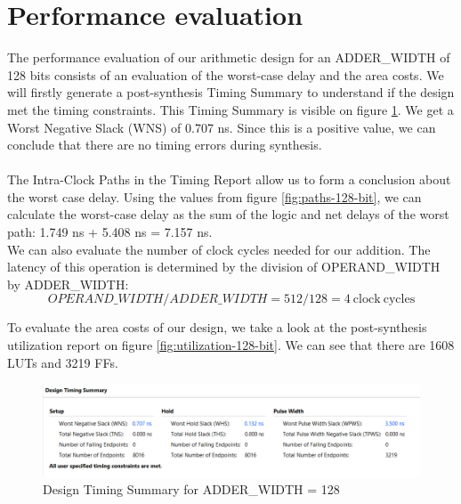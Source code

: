 \documentclass[a4paper,kul]{kulakarticle} %
\begin{document}
\section{Performance evaluation}


The performance evaluation of our arithmetic design for an ADDER\_WIDTH of 128 bits consists of an evaluation of the worst-case delay and the area costs. We will firstly generate a post-synthesis Timing Summary to understand if the design met the timing constraints. This Timing Summary is visible on figure \ref{fig:timing-128-bit}. We get a Worst Negative Slack (WNS) of 0.707 ns. Since this is a positive value, we can conclude that there are no timing errors during synthesis.
\\\\
The Intra-Clock Paths in the Timing Report allow us to form a conclusion about the worst case delay. Using the values from figure \ref{fig:paths-128-bit}, we can calculate the worst-case delay as the sum of the logic and net delays of the worst path: 1.749 ns + 5.408 ns = 7.157 ns.
\\
We can also evaluate the number of clock cycles needed for our addition. The latency of this operation is determined by the division of OPERAND\_WIDTH by ADDER\_WIDTH:
\begin{equation}
	OPERAND\_WIDTH/ADDER\_WIDTH = 512/128 = 4 \mathrm{\ clock\ cycles}
\end{equation} 

To evaluate the area costs of our design, we take a look at the post-synthesis utilization report on figure \ref{fig:utilization-128-bit}. We can see that there are 1608 LUTs and 3219 FFs.  

\begin{figure}[h]
	\centering
	\includegraphics[width=0.75\linewidth]{images/timing-128-bit.png}
	\caption{Design Timing Summary for ADDER\_WIDTH = 128}
	\label{fig:timing-128-bit}
\end{figure}
\end{document}
